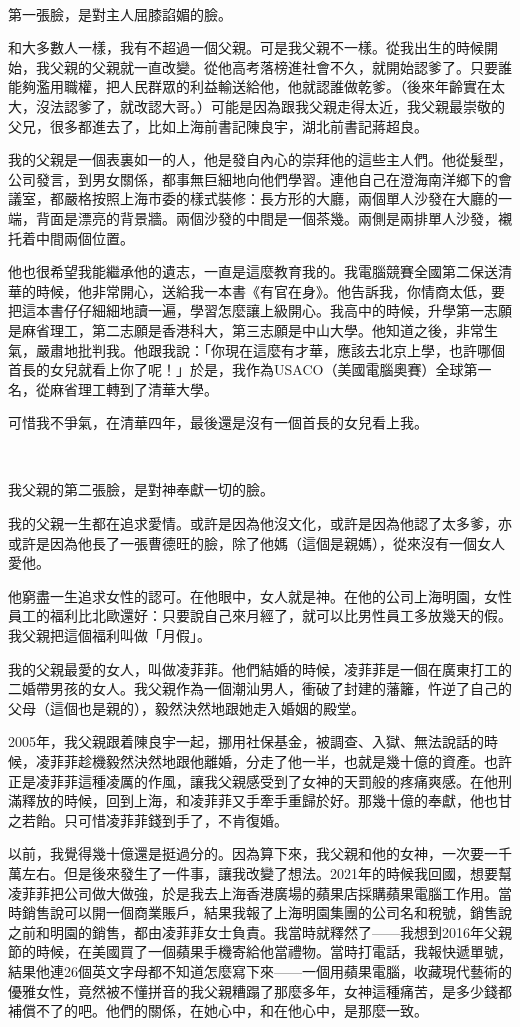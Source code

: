 \ 

第一張臉，是對主人屈膝諂媚的臉。

和大多數人一樣，我有不超過一個父親。可是我父親不一樣。從我出生的時候開始，我父親的父親就一直改變。從他高考落榜進社會不久，就開始認爹了。只要誰能夠濫用職權，把人民群眾的利益輸送給他，他就認誰做乾爹。（後來年齡實在太大，沒法認爹了，就改認大哥。）可能是因為跟我父親走得太近，我父親最崇敬的父兄，很多都進去了，比如上海前書記陳良宇，湖北前書記蔣超良。

我的父親是一個表裏如一的人，他是發自內心的崇拜他的這些主人們。他從髮型，公司發言，到男女關係，都事無巨細地向他們學習。連他自己在澄海南洋鄉下的會議室，都嚴格按照上海市委的樣式裝修：長方形的大廳，兩個單人沙發在大廳的一端，背面是漂亮的背景牆。兩個沙發的中間是一個茶幾。兩側是兩排單人沙發，襯托着中間兩個位置。

他也很希望我能繼承他的遺志，一直是這麼教育我的。我電腦競賽全國第二保送清華的時候，他非常開心，送給我一本書《有官在身》。他告訴我，你情商太低，要把這本書仔仔細細地讀一遍，學習怎麼讓上級開心。我高中的時候，升學第一志願是麻省理工，第二志願是香港科大，第三志願是中山大學。他知道之後，非常生氣，嚴肅地批判我。他跟我說：「你現在這麼有才華，應該去北京上學，也許哪個首長的女兒就看上你了呢！」於是，我作為USACO（美國電腦奧賽）全球第一名，從麻省理工轉到了清華大學。

可惜我不爭氣，在清華四年，最後還是沒有一個首長的女兒看上我。

\  

我父親的第二張臉，是對神奉獻一切的臉。

我的父親一生都在追求愛情。或許是因為他沒文化，或許是因為他認了太多爹，亦或許是因為他長了一張曹德旺的臉，除了他媽（這個是親媽），從來沒有一個女人愛他。

他窮盡一生追求女性的認可。在他眼中，女人就是神。在他的公司上海明園，女性員工的福利比北歐還好：只要說自己來月經了，就可以比男性員工多放幾天的假。我父親把這個福利叫做「月假」。

我的父親最愛的女人，叫做凌菲菲。他們結婚的時候，凌菲菲是一個在廣東打工的二婚帶男孩的女人。我父親作為一個潮汕男人，衝破了封建的藩籬，忤逆了自己的父母（這個也是親的），毅然決然地跟她走入婚姻的殿堂。

2005年，我父親跟着陳良宇一起，挪用社保基金，被調查、入獄、無法說話的時候，凌菲菲趁機毅然決然地跟他離婚，分走了他一半，也就是幾十億的資產。也許正是凌菲菲這種凌厲的作風，讓我父親感受到了女神的天罰般的疼痛爽感。在他刑滿釋放的時候，回到上海，和凌菲菲又手牽手重歸於好。那幾十億的奉獻，他也甘之若飴。只可惜凌菲菲錢到手了，不肯復婚。

以前，我覺得幾十億還是挺過分的。因為算下來，我父親和他的女神，一次要一千萬左右。但是後來發生了一件事，讓我改變了想法。2021年的時候我回國，想要幫凌菲菲把公司做大做強，於是我去上海香港廣場的蘋果店採購蘋果電腦工作用。當時銷售說可以開一個商業賬戶，結果我報了上海明園集團的公司名和稅號，銷售說之前和明園的銷售，都由凌菲菲女士負責。我當時就釋然了——我想到2016年父親節的時候，在美國買了一個蘋果手機寄給他當禮物。當時打電話，我報快遞單號，結果他連26個英文字母都不知道怎麼寫下來——一個用蘋果電腦，收藏現代藝術的優雅女性，竟然被不懂拼音的我父親糟蹋了那麼多年，女神這種痛苦，是多少錢都補償不了的吧。他們的關係，在她心中，和在他心中，是那麼一致。

